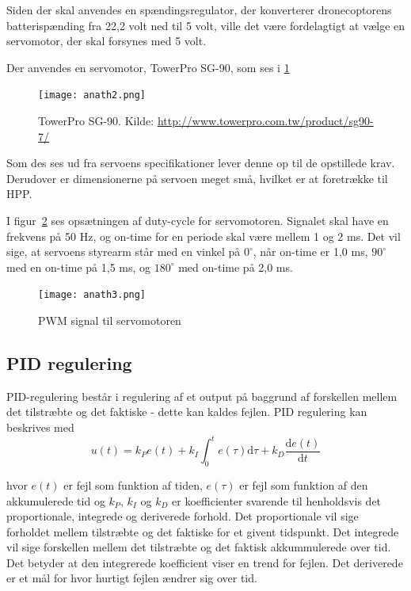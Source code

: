 \noindent Siden der skal anvendes en spændingsregulator, der konverterer dronecoptorens batterispænding fra 22,2 volt ned til 5 volt, ville det være fordelagtigt at vælge en servomotor, der skal forsynes med 5 volt.

Der anvendes en servomotor, TowerPro SG-90, som ses i \ref{fig:anath2}

\begin{figure}[h]
  \centering
  \texttt{[image: anath2.png]}
  \caption{TowerPro SG-90. Kilde: \url{http://www.towerpro.com.tw/product/sg90-7/}}
  \label{fig:anath2}
\end{figure}

Som des ses ud fra servoens specifikationer lever denne op til de opstillede krav. Derudover er dimensionerne på servoen meget små, hvilket er at foretrække til HPP.

I figur~\ref{fig:anath3} ses opsætningen af duty-cycle for servomotoren. Signalet skal have en frekvens på 50 Hz, og on-time for en periode skal være mellem 1 og 2 ms. Det vil sige, at servoens styrearm står med en vinkel på $0^\circ$, når on-time er 1,0 ms, $90^\circ$ med en on-time på 1,5 ms, og $180^\circ$ med on-time på 2,0 ms. 

\begin{figure}[h]
  \centering
  \texttt{[image: anath3.png]}
  \caption{PWM signal til servomotoren}
  \label{fig:anath3}
\end{figure}

\subsection{PID regulering}
\label{sec:overordnet-mal}

PID-regulering består i regulering af et output på baggrund af forskellen mellem det tilstræbte og det faktiske - dette kan kaldes fejlen. PID regulering kan beskrives med
\begin{equation}
  \label{eq:1}
  u(t)=k_Pe(t)+k_I \int_0^t e(\tau)\mathrm{d}\tau + k_D\frac{\mathrm{d}e(t)}{\mathrm{d}t}
\end{equation}

hvor $e(t)$ er fejl som funktion af tiden, $e(\tau)$ er fejl som funktion af den akkumulerede tid og $k_P$, $k_I$ og $k_D$ er koefficienter svarende til henholdsvis det proportionale, integrede og deriverede forhold. Det proportionale vil sige forholdet mellem tilstræbte og det faktiske for et givent tidspunkt. Det integrede vil sige forskellen mellem det tilstræbte og det faktisk akkummulerede over tid. Det betyder at den integrerede koefficient viser en trend for fejlen. Det deriverede er et mål for hvor hurtigt fejlen ændrer sig over tid.

